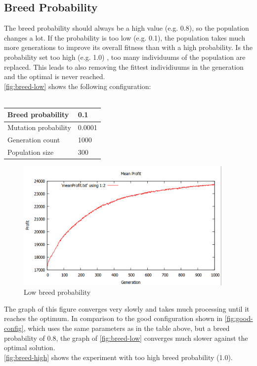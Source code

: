 \documentclass[fontsize=12pt,toc=bibliography, notitlepage]{scrreprt}
\begin{document}
\subsection{Breed Probability}
\label{subsec:breed-probability}
The breed probability should always be a high value (e.g. 0.8), so the population changes a lot. If the probability is too low (e.g. 0.1), the population takes much more generations to improve its overall fitness than with a high probability. Is the probability set too high (e.g. 1.0) , too many individuums of the population are replaced. This leads to also removing the fittest individiuums in the generation and the optimal is never reached.\\
\autoref{fig:breed-low} shows the following configuration:\\ \\
\begin{tabular}{ |l|l| }
	\hline
	Breed probability & 0.1 \\ \hline
	Mutation probability & 0.0001 \\ \hline
	Generation count & 1000 \\ \hline
	Population size & 300 \\ \hline
\end{tabular}
\begin{figure}[H]
	\centering
	\includegraphics[width=400px]{images/breed-low.png}
	\caption{Low breed probability}
	\label{fig:breed-low}
\end{figure}
The graph of this figure converges very slowly and takes much processing until it reaches the optimum. In comparison to the good configuration shown in \autoref{fig:good-config}, which uses the same parameters as in the table above, but a breed probability of 0.8, the graph of \autoref{fig:breed-low} converges much slower against the optimal solution.\\
\autoref{fig:breed-high} shows the experiment with too high breed probability (1.0).
\end{document}

